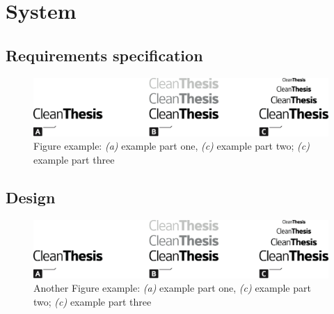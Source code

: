 %
\chapter{System}
\label{sec:system}


\Blindtext[2][1]



\section{Requirements specification}
\label{sec:system:spec}


\Blindtext[1][2]

\begin{figure}[htb]
	\includegraphics[width=\textwidth]{gfx/Clean-Thesis-Figure}
	\caption{Figure example: \textit{(a)} example part one, \textit{(c)} example part two; \textit{(c)} example part three}
	\label{fig:system:example1}
\end{figure}

\Blindtext[1][2]

\section{Design}
\label{sec:system:design}


\Blindtext[1][2]

\begin{figure}[htb]
	\includegraphics[width=\textwidth]{gfx/Clean-Thesis-Figure}
	\caption{Another Figure example: \textit{(a)} example part one, \textit{(c)} example part two; \textit{(c)} example part three}
	\label{fig:system:example2}
\end{figure}

